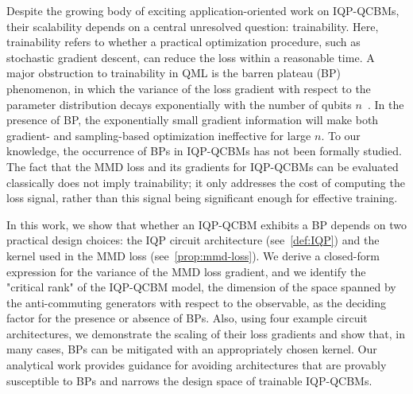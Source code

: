 \documentclass{article}
\theoremstyle{plain}
\theoremstyle{definition}
\theoremstyle{remark}
\begin{document}
Despite the growing body of exciting application-oriented work on IQP-QCBMs, their scalability depends on a central unresolved question: trainability. 
Here, trainability refers to whether a practical optimization procedure, such as stochastic gradient descent, can reduce the loss within a reasonable time. 
A major obstruction to trainability in QML is the barren plateau (BP) phenomenon, in which the variance of the loss gradient with respect to the parameter distribution decays exponentially with the number of qubits $n$~\citep{mcclean18,Cerezo21,Holmes22,Larocca25}. In the presence of BP, the exponentially small gradient information will make both gradient- and sampling-based optimization ineffective for large $n$. To our knowledge, the occurrence of BPs in IQP-QCBMs has not been formally studied. The fact that the MMD loss and its gradients for IQP-QCBMs can be evaluated classically does not imply trainability; it only addresses the cost of computing the loss signal, rather than this signal being significant enough for effective training.

In this work, we show that whether an IQP-QCBM exhibits a BP depends on two practical design choices: the IQP circuit architecture (see~\cref{def:IQP}) and the kernel used in the MMD loss (see~\cref{prop:mmd-loss}). We derive a closed-form expression for the variance of the MMD loss gradient, and we identify the "critical rank" of the IQP-QCBM model, the dimension of the space spanned by the anti-commuting generators with respect to the observable, as the deciding factor for the presence or absence of BPs. Also, using four example circuit architectures, we demonstrate the scaling of their loss gradients and show that, in many cases, BPs can be mitigated with an appropriately chosen kernel. Our analytical work provides guidance for avoiding architectures that are provably susceptible to BPs and narrows the design space of trainable IQP-QCBMs.
\end{document}
